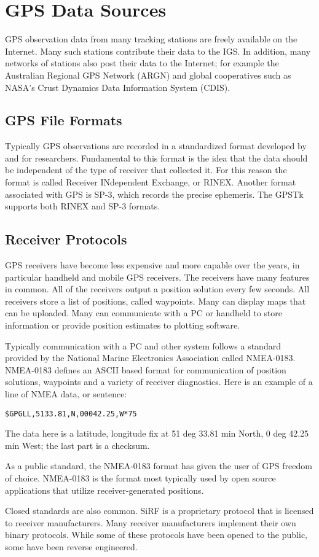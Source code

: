 \section{GPS Data Sources}

GPS observation data from many tracking stations are freely available on the Internet. Many such stations contribute their data to the IGS. In addition, many networks of stations also post their data to the Internet; for example the Australian Regional GPS Network (ARGN) and global cooperatives such as NASA's Crust Dynamics Data Information System (CDIS).

\subsection{GPS File Formats}
Typically GPS observations are recorded in a standardized format developed by and for researchers. Fundamental to this format is the idea that the data should be independent of the type of receiver that collected it. For this reason the format is called Receiver INdependent Exchange, or RINEX. Another format associated with GPS is SP-3, which records the precise ephemeris. The GPSTk supports both RINEX and SP-3 formats.


\subsection{Receiver Protocols}

GPS receivers have become less expensive and more capable over the years, in particular handheld and mobile GPS receivers. The receivers have many features in common. All of the receivers output a position solution every few seconds. All receivers store a list of positions, called waypoints. Many can display maps that can be uploaded. Many can communicate with a PC or handheld to store information or provide position estimates to plotting software.

Typically communication with a PC and other system follows a standard provided by the National Marine Electronics Association called NMEA-0183. NMEA-0183 defines an ASCII based format for communication of position solutions, waypoints and a variety of receiver diagnostics. Here is an example of a line of NMEA data, or sentence:

\begin{verbatim}
$GPGLL,5133.81,N,00042.25,W*75
\end{verbatim}

The data here is a latitude, longitude fix at 51 deg 33.81 min North, 0 deg 42.25 min West; the last part is a checksum.

As a public standard, the NMEA-0183 format has given the user of GPS freedom of choice. NMEA-0183 is the format most typically used by open source applications that utilize receiver-generated positions.

Closed standards are also common. SiRF is a proprietary protocol that is licensed to receiver manufacturers. Many receiver manufacturers implement their own binary protocols. While some of these protocols have been opened to the public, some have been reverse engineered. 




